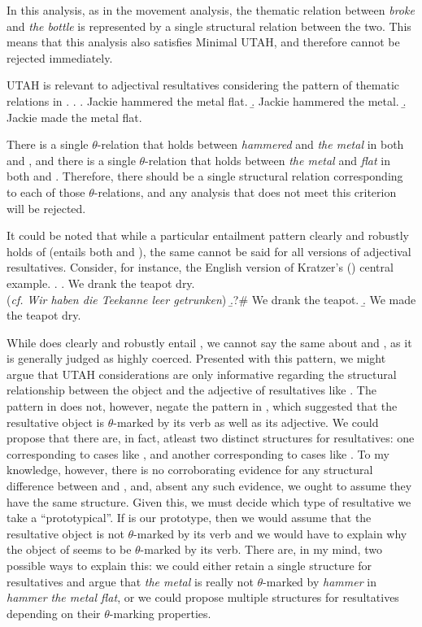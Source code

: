 \documentclass[MilwayThesis]{subfiles}
\begin{document}
In this analysis, as in the movement analysis, the thematic relation between \textit{broke} and \textit{the bottle} is represented by a single structural relation between the two.
This means that this analysis also satisfies Minimal UTAH, and therefore cannot be rejected immediately.

UTAH is relevant to adjectival resultatives considering the pattern of thematic relations in \Next.
\ex.
\a. Jackie hammered the metal flat.
\b. Jackie hammered the metal.
\b. Jackie made the metal flat.

There is a single $\theta$-relation that holds between \textit{hammered} and \textit{the metal} in both \Last[a] and \Last[b], and there is a single $\theta$-relation that holds between \textit{the metal} and \textit{flat} in  both \Last[a] and \Last[c]. 
Therefore, there should be a single structural relation corresponding to each of those $\theta$-relations, and any analysis that does not meet this criterion will be rejected.

It could be noted that while a particular entailment pattern clearly and robustly holds of \Last (\Last[a] entails both \Last[b] and \Last[c]), the same cannot be said for all versions of adjectival resultatives.
Consider, for instance, \Next the English version of Kratzer's (\citeyear{kratzer2004building}) central example.
\ex. 
\a. We drank the teapot dry.\\
(\textit{cf.} \textit{Wir haben die Teekanne leer getrunken})
\b.?\# We drank the teapot.
\b. We made the teapot dry. 

While \Last[a] does clearly and robustly entail \Last[c], we cannot say the same about \Last[a] and \Last[b], as it is generally judged as highly coerced.
Presented with this pattern, we might argue that UTAH considerations are only informative regarding the structural relationship between the object and the adjective of resultatives like \Last[a].
The pattern in \Last does not, however, negate the pattern in \LLast, which suggested that the resultative object is $\theta$-marked by its verb as well as its adjective.
We could propose that there are, in fact, atleast two distinct structures for resultatives: one corresponding to cases like \LLast, and another corresponding to cases like \Last.
To my knowledge, however, there is no corroborating evidence for any structural difference between \LLast[a] and \Last[a], and, absent any such evidence, we ought to assume they have the same structure.
Given this, we must decide which type of resultative we take a ``prototypical''.
If \Last[a] is our prototype, then we would assume that the resultative object is not $\theta$-marked by its verb and we would have to explain why the object of \LLast[a] seems to be $\theta$-marked by its verb.
There are, in my mind, two possible ways to explain this: we could either retain a single structure for resultatives and argue that \textit{the metal} is really not $\theta$-marked by \textit{hammer} in \textit{hammer the metal flat}, or we could propose multiple structures for resultatives depending on their $\theta$-marking properties.
\end{document}
